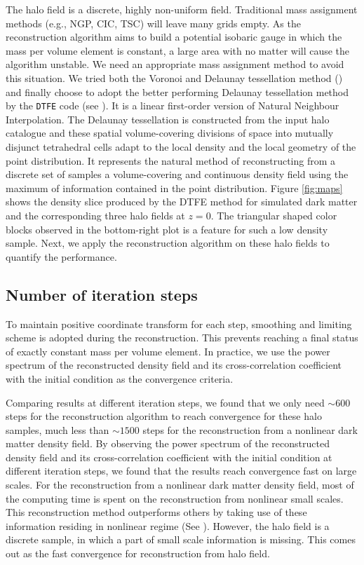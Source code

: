 \documentclass[iop]{emulateapj}
\begin{document}
{The halo field is a discrete, highly non-uniform field.
Traditional mass assignment methods (e.g., NGP, CIC, TSC) will leave many grids empty.
As the reconstruction algorithm aims to build a potential isobaric gauge in which the mass per volume element is constant, 
a large area with no matter will cause the algorithm unstable.
We need an appropriate mass assignment method to avoid this situation.
We tried both the Voronoi and Delaunay tessellation method (\cite{Bernardeau96,van-de-Weygaert09})
and finally choose to adopt the better performing Delaunay tessellation method by the \texttt{DTFE} code (see \cite{Cautun11}).
It is a linear first-order version of Natural Neighbour Interpolation.
The Delaunay tessellation is constructed from the input halo catalogue and
these spatial volume-covering divisions of space into mutually disjunct tetrahedral cells adapt to the local density and the local geometry of the point distribution.
It represents the natural method of reconstructing from a discrete set of samples a volume-covering and continuous density field using the maximum of information contained in the point distribution.
Figure \ref{fig:maps} shows the density slice produced by the DTFE method for simulated dark matter and the corresponding three halo fields at $z=0$.
The triangular shaped color blocks observed in the bottom-right plot is a feature for such a low density sample.
Next, we apply the reconstruction algorithm on these halo fields to quantify the performance.

\subsection{Number of iteration steps}
\label{sec:iteration}

To maintain positive coordinate transform for each step, smoothing and limiting scheme is adopted during the reconstruction.
This prevents reaching a final status of exactly constant mass per volume element.
In practice, we use the power spectrum of the reconstructed density field and its cross-correlation coefficient with the initial condition as the convergence criteria.

Comparing results at different iteration steps, we found that we only need $\sim 600$ steps for the reconstruction algorithm to reach convergence for these halo samples, much less than $\sim 1500$ steps for the reconstruction from a nonlinear dark matter density field.
By observing the power spectrum of the reconstructed density field and its cross-correlation coefficient with the initial condition at different iteration steps, we found that the results reach convergence fast on large scales.
For the reconstruction from a nonlinear dark matter density field, most of the computing time is spent on the reconstruction from nonlinear small scales.
This reconstruction method outperforms others by taking use of these information residing in nonlinear regime (See \cite{zhuhm16c}).
However, the halo field is a discrete sample, in which a part of small scale information is missing. 
This comes out as the fast convergence for reconstruction from halo field.

}
\end{document}

